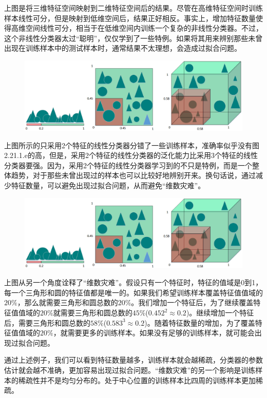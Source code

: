 上图是将三维特征空间映射到二维特征空间后的结果。尽管在高维特征空间时训练样本线性可分，但是映射到低维空间后，结果正好相反。事实上，增加特征数量使得高维空间线性可分，相当于在低维空间内训练一个复杂的非线性分类器。不过，这个非线性分类器太过“聪明”，仅仅学到了一些特例。如果将其用来辨别那些未曾出现在训练样本中的测试样本时，通常结果不太理想，会造成过拟合问题。

 \begin{figure}[h]
   \centering
   \includegraphics[width=.5\textwidth]{imgs/2.21.1.6.eps}
 \end{figure}

上图所示的只采用2个特征的线性分类器分错了一些训练样本，准确率似乎没有图2.21.1.e的高，但是，采用2个特征的线性分类器的泛化能力比采用3个特征的线性分类器要强。因为，采用2个特征的线性分类器学习到的不只是特例，而是一个整体趋势，对于那些未曾出现过的样本也可以比较好地辨别开来。换句话说，通过减少特征数量，可以避免出现过拟合问题，从而避免“维数灾难”。

 \begin{figure}[h]
   \centering
   \includegraphics[width=.9\textwidth]{imgs/2.21.1.6.eps}
 \end{figure}

上图从另一个角度诠释了``维数灾难''。假设只有一个特征时，特征的值域是0到1，每一个三角形和圆的特征值都是唯一的。如果我们希望训练样本覆盖特征值值域的$20\%$，那么就需要三角形和圆总数的$20\%$。我们增加一个特征后，为了继续覆盖特征值值域的$20\%$就需要三角形和圆总数的$45\%$($0.452^2\approx0.2$)。继续增加一个特征后，需要三角形和圆总数的$58\%$($0.583^3\approx0.2$)。随着特征数量的增加，为了覆盖特征值值域的$20\%$，就需要更多的训练样本。如果没有足够的训练样本，就可能会出现过拟合问题。


通过上述例子，我们可以看到特征数量越多，训练样本就会越稀疏，分类器的参数估计就会越不准确，更加容易出现过拟合问题。“维数灾难”的另一个影响是训练样本的稀疏性并不是均匀分布的。处于中心位置的训练样本比四周的训练样本更加稀疏。

